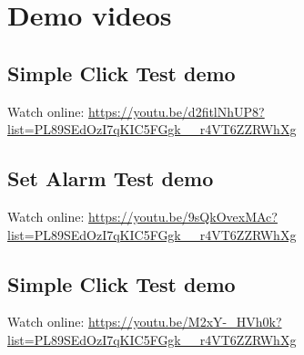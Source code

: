 \chapter{Demo videos}
\label{ch:droid_setup}
\section{Simple Click Test demo}
Watch online: \url{https://youtu.be/d2fitlNhUP8?list=PL89SEdOzI7qKIC5FGgk__r4VT6ZZRWhXg}

\section{Set Alarm Test demo}
Watch online: \url{https://youtu.be/9sQkOvexMAc?list=PL89SEdOzI7qKIC5FGgk__r4VT6ZZRWhXg}

\section{Simple Click Test demo}
Watch online: \url{https://youtu.be/M2xY-_HVh0k?list=PL89SEdOzI7qKIC5FGgk__r4VT6ZZRWhXg}

